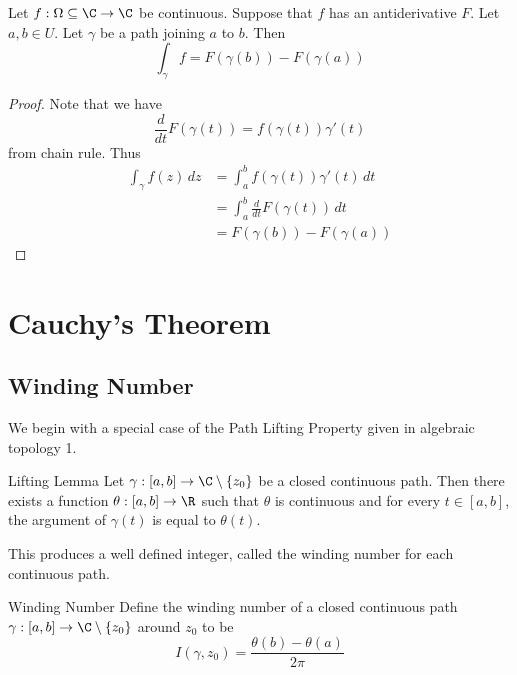 \documentclass[a4paper]{article}
\begin{document}
\begin{thm}{}{} Let $f:\Omega\subseteq\C\to\C$ be continuous. Suppose that $f$ has an antiderivative $F$. Let $a,b\in U$. Let $\gamma$ be a path joining $a$ to $b$. Then $$\int_{\gamma}f=F(\gamma(b))-F(\gamma(a))$$ \tcbline
\begin{proof} Note that we have $$\frac{d}{dt}F(\gamma(t))=f(\gamma(t))\gamma'(t)$$ from chain rule. Thus
\begin{align*}
\int_{\gamma}f(z)\,dz&=\int_a^bf(\gamma(t))\gamma'(t)\,dt\\
&=\int_a^b\frac{d}{dt}F(\gamma(t))\,dt\\
&=F(\gamma(b))-F(\gamma(a))\tag{By the FTC}
\end{align*}
\end{proof}
\end{thm}

\pagebreak
\section{Cauchy's Theorem}
\subsection{Winding Number}
We begin with a special case of the Path Lifting Property given in algebraic topology 1. 

\begin{thm}{Lifting Lemma}{} Let $\gamma:[a,b]\to\C\setminus\{z_0\}$ be a closed continuous path. Then there exists a function $\theta:[a,b]\to\R$ such that $\theta$ is continuous and for every $t\in[a,b]$, the argument of $\gamma(t)$ is equal to $\theta(t)$. 
\end{thm}

This produces a well defined integer, called the winding number for each continuous path. 

\begin{defn}{Winding Number}{} Define the winding number of a closed continuous path $\gamma:[a,b]\to\C\setminus\{z_0\}$ around $z_0$ to be $$I(\gamma,z_0)=\frac{\theta(b)-\theta(a)}{2\pi}$$
\end{defn}
\end{document}
